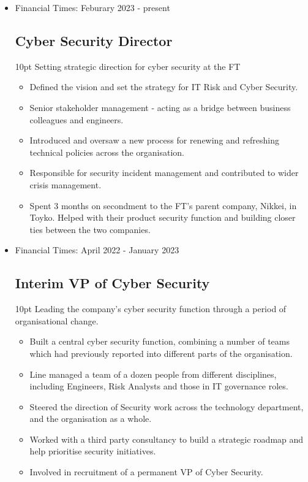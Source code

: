 \documentclass[a4paper]{article}
\newenvironment{detail}{\begin{adjustwidth}{10pt}{}}{\end{adjustwidth}}
\begin{document}
\begin{itemize}


\item Financial Times: Feburary 2023 - present
\subsection*{Cyber Security Director}
\begin{detail}
Setting strategic direction for cyber security at the FT

\begin{itemize}
	\item Defined the vision and set the strategy for IT Risk and Cyber Security.
	\item Senior stakeholder management - acting as a bridge between business colleagues and engineers.
	\item Introduced and oversaw a new process for renewing and refreshing technical policies across the organisation.
	\item Responsible for security incident management and contributed to wider crisis management.
	\item Spent 3 months on secondment to the FT's parent company, Nikkei, in Toyko.  Helped with their product security function and building closer ties between the two companies.
\end{itemize}
\end{detail}

\item Financial Times: April 2022 - January 2023
\subsection*{Interim VP of Cyber Security}
\begin{detail}
Leading the company's cyber security function through a period of organisational change.

\begin{itemize}
	\item Built a central cyber security function, combining a number of teams which had previously reported into different parts of the organisation.
	\item Line managed a team of a dozen people from different disciplines, including Engineers, Risk Analysts and those in IT governance roles.
	\item Steered the direction of Security work across the technology department, and the organisation as a whole.
	\item Worked with a third party consultancy to build a strategic roadmap and help prioritise security initiatives.
	\item Involved in recruitment of a permanent VP of Cyber Security.
\end{itemize}
\end{detail}


\end{itemize}
\end{document}
